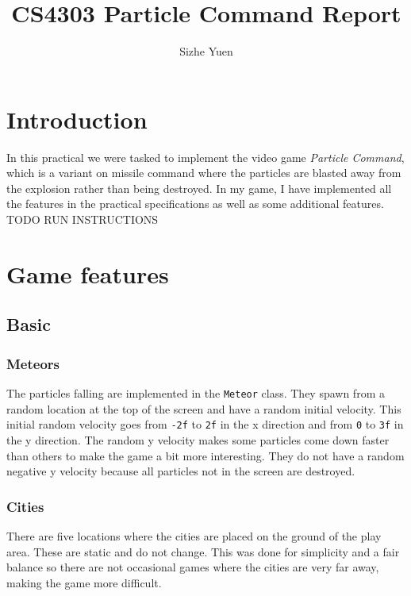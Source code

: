 \documentclass{article}
\title{CS4303 Particle Command Report}
\author{Sizhe Yuen}
\newcommand{\n}[0]{\\[\baselineskip]}
\begin{document}
\maketitle

\section{Introduction}
In this practical we were tasked to implement the video game \textit{Particle Command}, which is a variant on missile command where the particles are blasted away from the explosion rather than being destroyed. In my game, I have implemented all the features in the practical specifications as well as some additional features.
\n
TODO RUN INSTRUCTIONS

\section{Game features}

\subsection{Basic}
\subsubsection*{Meteors}
The particles falling are implemented in the \texttt{Meteor} class. They spawn from a random location at the top of the screen and have a random initial velocity. This initial random velocity goes from \texttt{-2f} to \texttt{2f} in the x direction and from \texttt{0} to \texttt{3f} in the y direction. The random y velocity makes some particles come down faster than others to make the game a bit more interesting. They do not have a random negative y velocity because all particles not in the screen are destroyed. 

\subsubsection*{Cities}
There are five locations where the cities are placed on the ground of the play area. These are static and do not change. This was done for simplicity and a fair balance so there are not occasional games where the cities are very far away, making the game more difficult. 
\end{document}
